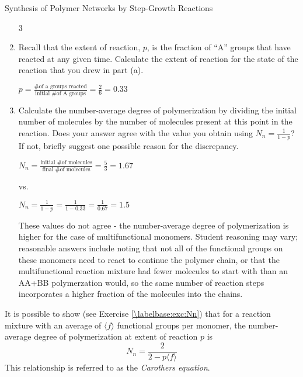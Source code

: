 \begin{activity}[extension]{Synthesis of Polymer Networks by Step-Growth Reactions}
\begin{ctqs}
\begin{enumerate}
				\begin{solution}[0.5in]
					3
				\end{solution}
				
			\item Recall that the extent of reaction, $p$, is the fraction of ``A'' groups that have reacted at any given time.  Calculate the extent of reaction for the state of the reaction that you drew in part (a).
			
				\begin{solution}[1.25in]
					$p = \frac{\text{\# of a groups reacted}}{\text{initial \# of A groups}} = \frac{2}{6} = 0.33$
				\end{solution}
				
			\item Calculate the number-average degree of polymerization by dividing the initial number of molecules by the number of molecules present at this point in the reaction.  Does your answer agree with the value you obtain using $N_n = \frac{1}{1-p}$?  If not, briefly suggest one possible reason for the discrepancy.
			
				\begin{solution}[2in]
					$N_n = \frac{\text{initial \# of molecules}}{\text{final \# of molecules}} = \frac{5}{3} = 1.67$
					
					vs.
					
					$N_n = \frac{1}{1-p} = \frac{1}{1-0.33} = \frac{1}{0.67} = 1.5$
					
					These values do not agree - the number-average degree of polymerization is higher for the case of multifunctional monomers.  Student reasoning may vary; reasonable answers include noting that not all of the functional groups on these monomers need to react to continue the polymer chain, or that the multifunctional reaction mixture had fewer molecules to start with than an AA+BB polymerzation would, so the same number of reaction steps incorporates a higher fraction of the molecules into the chains.
				\end{solution}
		\end{enumerate}
\end{ctqs}

\clearpage
\begin{infobox}
	It is possible to show (see Exercise \ref{\labelbase:exc:Nn}) that for a reaction mixture with an average of $\langle f\rangle$ functional groups per monomer, the number-average degree of polymerization at extent of reaction $p$ is
	\begin{equation*}
		N_n = \frac{2}{2-p\langle f \rangle} \label{\labelbase:eqn:carothers}
	\end{equation*}
	This relationship is referred to as the \emph{Carothers equation}.
\end{infobox}


\end{activity}
